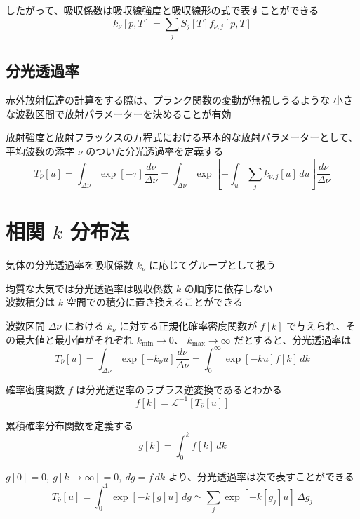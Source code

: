\documentclass[article]{dennou777}
\begin{document}
したがって、吸収係数は吸収線強度と吸収線形の式で表すことができる
\begin{equation}
	k_\nu[p,T]=\sum_j S_j[T]f_{\nu,j}[p,T]
\end{equation}

\subsection{分光透過率}
赤外放射伝達の計算をする際は、プランク関数の変動が無視しうるような
小さな波数区間で放射パラメーターを決めることが有効

放射強度と放射フラックスの方程式における基本的な放射パラメーターとして、
平均波数の添字 $\bar\nu$ のついた分光透過率を定義する
\begin{equation}
	T_{\bar\nu}[u]
	=\int_{\Delta\nu}\exp[-\tau]\frac{d\nu}{\Delta\nu}
	=\int_{\Delta\nu}\exp\left[-\int_u\sum_j k_{\nu,j}[u]\,du\right]\frac{d\nu}{\Delta\nu}
\end{equation}

\section{相関 $k$ 分布法}

気体の分光透過率を吸収係数 $k_\nu$ に応じてグループとして扱う

均質な大気では分光透過率は吸収係数 $k$ の順序に依存しない\\
波数積分は $k$ 空間での積分に置き換えることができる

波数区間 $\Delta\nu$ における $k_\nu$ に対する正規化確率密度関数が
$f[k]$ で与えられ、その最大値と最小値がそれぞれ $k_{\mathrm{min}}\to0$、
$k_{\mathrm{max}}\to\infty$ だとすると、分光透過率は
\begin{equation}
	T_{\bar\nu}[u]=\int_{\Delta\nu}\exp[-k_\nu u]\frac{d\nu}{\Delta\nu}=\int^\infty_0 \exp[-ku]f[k]\,dk
\end{equation}

確率密度関数 $f$ は分光透過率のラプラス逆変換であるとわかる
\begin{equation}
	f[k]=\mathcal{L}^{-1}[T_{\bar\nu}[u]]
\end{equation}

累積確率分布関数を定義する
\begin{equation}
	g[k]=\int^k_0 f[k]\,dk
\end{equation}

$g[0]=0,\ g[k\to\infty]=0,\ dg=f\,dk$ より、分光透過率は次で表すことができる
\begin{equation}
	T_{\bar\nu}[u]=\int^1_0 \exp[-k[g]u]\,dg\simeq\sum_j\exp[-k[g_j]u]\,\Delta g_j
\end{equation}
\end{document}
